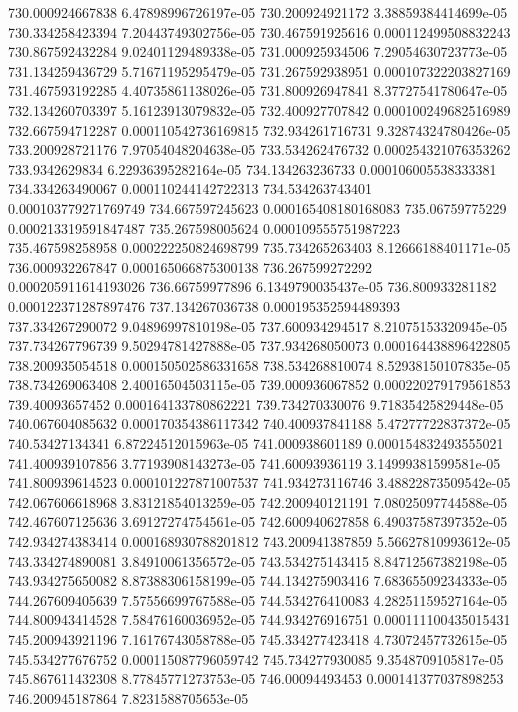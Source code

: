 {730.000924667838 6.47898996726197e-05
730.200924921172 3.38859384414699e-05
730.334258423394 7.20443749302756e-05
730.467591925616 0.000112499508832243
730.867592432284 9.02401129489338e-05
731.000925934506 7.29054630723773e-05
731.134259436729 5.71671195295479e-05
731.267592938951 0.000107322203827169
731.467593192285 4.40735861138026e-05
731.800926947841 8.37727541780647e-05
732.134260703397 5.16123913079832e-05
732.400927707842 0.000100249682516989
732.667594712287 0.000110542736169815
732.934261716731 9.32874324780426e-05
733.200928721176 7.97054048204638e-05
733.534262476732 0.000254321076353262
733.9342629834 6.22936395282164e-05
734.134263236733 0.000106005538333381
734.334263490067 0.000110244142722313
734.534263743401 0.000103779271769749
734.667597245623 0.000165408180168083
735.06759775229 0.000213319591847487
735.267598005624 0.000109555751987223
735.467598258958 0.000222250824698799
735.734265263403 8.12666188401171e-05
736.000932267847 0.000165066875300138
736.267599272292 0.000205911614193026
736.66759977896 6.1349790035437e-05
736.800933281182 0.000122371287897476
737.134267036738 0.000195352594489393
737.334267290072 9.04896997810198e-05
737.600934294517 8.21075153320945e-05
737.734267796739 9.50294781427888e-05
737.934268050073 0.000164438896422805
738.200935054518 0.000150502586331658
738.534268810074 8.52938150107835e-05
738.734269063408 2.40016504503115e-05
739.000936067852 0.000220279179561853
739.40093657452 0.000164133780862221
739.734270330076 9.71835425829448e-05
740.067604085632 0.000170354386117342
740.400937841188 5.47277722837372e-05
740.53427134341 6.87224512015963e-05
741.000938601189 0.000154832493555021
741.400939107856 3.77193908143273e-05
741.60093936119 3.14999381599581e-05
741.800939614523 0.000101227871007537
741.934273116746 3.48822873509542e-05
742.067606618968 3.83121854013259e-05
742.200940121191 7.08025097744588e-05
742.467607125636 3.69127274754561e-05
742.600940627858 6.49037587397352e-05
742.934274383414 0.000168930788201812
743.200941387859 5.56627810993612e-05
743.334274890081 3.84910061356572e-05
743.534275143415 8.84712567382198e-05
743.934275650082 8.87388306158199e-05
744.134275903416 7.68365509234333e-05
744.267609405639 7.57556699767588e-05
744.534276410083 4.28251159527164e-05
744.800943414528 7.58476160036952e-05
744.934276916751 0.000111100435015431
745.200943921196 7.16176743058788e-05
745.334277423418 4.73072457732615e-05
745.534277676752 0.000115087796059742
745.734277930085 9.3548709105817e-05
745.867611432308 8.77845771273753e-05
746.00094493453 0.000141377037898253
746.200945187864 7.8231588705653e-05
}
